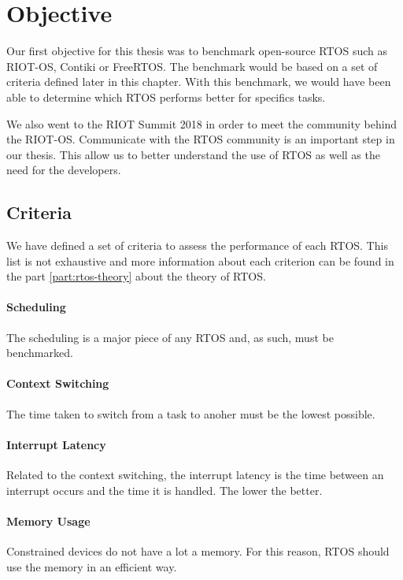 \section{Objective}

Our first objective for this thesis was to benchmark open-source RTOS such as RIOT-OS, Contiki or FreeRTOS.
The benchmark would be based on a set of criteria defined later in this chapter.
With this benchmark, we would have been able to determine which RTOS performs better for specifics tasks.

We also went to the RIOT Summit 2018 in order to meet the community behind the RIOT-OS.
Communicate with the RTOS community is an important step in our thesis.
This allow us to better understand the use of RTOS as well as the need for the developers.

\subsection{Criteria}
We have defined a set of criteria to assess the performance of each RTOS.
This list is not exhaustive and more information about each criterion can be found in the part \ref{part:rtos-theory} about the theory of RTOS.

\paragraph{Scheduling}
The scheduling is a major piece of any RTOS and, as such, must be benchmarked.

\paragraph{Context Switching}
The time taken to switch from a task to anoher must be the lowest possible.

\paragraph{Interrupt Latency}
Related to the context switching, the interrupt latency is the time between an interrupt occurs and the time it is handled.
The lower the better.

\paragraph{Memory Usage}
Constrained devices do not have a lot a memory.
For this reason, RTOS should use the memory in an efficient way.

